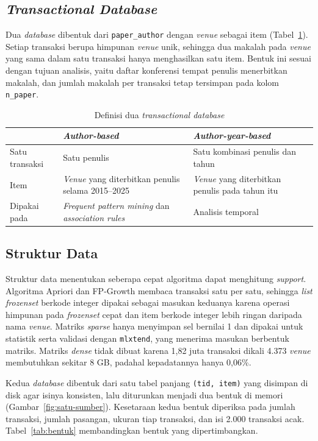 \subsection{\textit{Transactional Database}}
Dua \textit{database} dibentuk dari \texttt{paper\_author} dengan \textit{venue} sebagai item (Tabel~\ref{tab:def-db}). Setiap transaksi berupa himpunan \textit{venue} unik, sehingga dua makalah pada \textit{venue} yang sama dalam satu transaksi hanya menghasilkan satu item. Bentuk ini sesuai dengan tujuan analisis, yaitu daftar konferensi tempat penulis menerbitkan makalah, dan jumlah makalah per transaksi tetap tersimpan pada kolom \texttt{n\_paper}.

\begin{table}[!htb]
\caption{Definisi dua \textit{transactional database}}
\label{tab:def-db}
\small
\begin{tabularx}{\textwidth}{@{}p{2.8cm}XX@{}}
\toprule
 & \textbf{\textit{Author-based}} & \textbf{\textit{Author-year-based}} \\
\midrule
Satu transaksi & Satu penulis & Satu kombinasi penulis dan tahun \\
\midrule
Item & \textit{Venue} yang diterbitkan penulis selama 2015--2025 & \textit{Venue} yang diterbitkan penulis pada tahun itu \\
\midrule
Dipakai pada & \textit{Frequent pattern mining} dan \textit{association rules} & Analisis temporal \\
\bottomrule
\end{tabularx}
\end{table}

\subsection{Struktur Data}
\label{sec:struktur-data}
Struktur data menentukan seberapa cepat algoritma dapat menghitung \textit{support}. Algoritma Apriori dan FP-Growth membaca transaksi satu per satu, sehingga \textit{list} \textit{frozenset} berkode integer dipakai sebagai masukan keduanya karena operasi himpunan pada \textit{frozenset} cepat dan item berkode integer lebih ringan daripada nama \textit{venue}. Matriks \textit{sparse} hanya menyimpan sel bernilai 1 dan dipakai untuk statistik serta validasi dengan \texttt{mlxtend}, yang menerima masukan berbentuk matriks. Matriks \textit{dense} tidak dibuat karena 1,82 juta transaksi dikali 4.373 \textit{venue} membutuhkan sekitar 8 GB, padahal kepadatannya hanya 0,06\%.

Kedua \textit{database} dibentuk dari satu tabel panjang \texttt{(tid, item)} yang disimpan di disk agar isinya konsisten, lalu diturunkan menjadi dua bentuk di memori (Gambar~\ref{fig:satu-sumber}). Kesetaraan kedua bentuk diperiksa pada jumlah transaksi, jumlah pasangan, ukuran tiap transaksi, dan isi 2.000 transaksi acak. Tabel~\ref{tab:bentuk} membandingkan bentuk yang dipertimbangkan.

